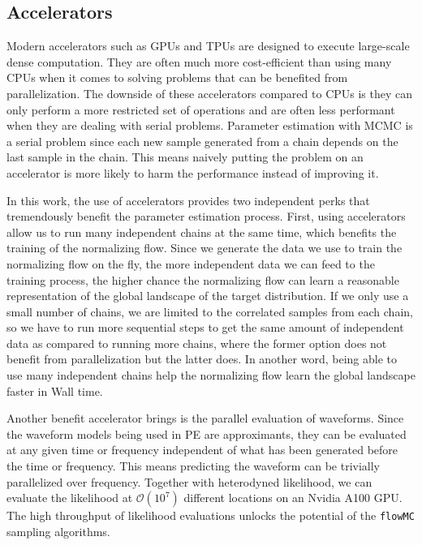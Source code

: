 \documentclass[twocolumn]{aastex631}
\begin{document}
\subsection{Accelerators}
\label{sec:accelerators}

Modern accelerators such as GPUs and TPUs are designed to execute large-scale
dense computation. They are often much more cost-efficient than using many CPUs
when it comes to solving problems that can be benefited from parallelization.
The downside of these accelerators compared to CPUs is they can only perform a
more restricted set of operations and are often less performant when they are
dealing with serial problems. Parameter estimation with MCMC is a serial
problem since each new sample generated from a chain depends on the last sample
in the chain. This means naively putting the problem on an accelerator is more
likely to harm the performance instead of improving it.


In this work, the use of accelerators provides two independent perks that
tremendously benefit the parameter estimation process. First, using
accelerators allow us to run many independent chains at the same time, which
benefits the training of the normalizing flow. Since we generate the data we use
to train the normalizing flow on the fly, the more independent data we can feed
to the training process, the higher chance the normalizing flow can learn a
reasonable representation of the global landscape of the target distribution. If
we only use a small number of chains, we are limited to the correlated samples
from each chain, so we have to run more sequential steps to get the same amount
of independent data as compared to running more chains, where the former option does
not benefit from parallelization but the latter does. In another word, being
able to use many independent chains help the normalizing flow learn the global
landscape faster in Wall time.

Another benefit accelerator brings is the parallel evaluation of waveforms. Since
the waveform models being used in PE are approximants, they can be evaluated at
any given time or frequency independent of what has been generated before the
time or frequency. This means predicting the waveform can be trivially
parallelized over frequency. Together with heterodyned likelihood, we can
evaluate the likelihood at $\mathcal{O}(10^7)$ different locations on an Nvidia
A100 GPU. The high throughput of likelihood evaluations unlocks the potential of
the \texttt{flowMC} sampling algorithms.
\end{document}
